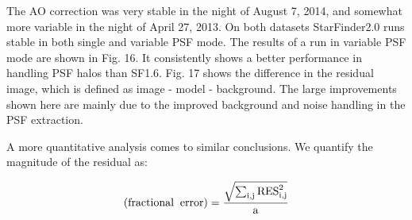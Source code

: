 The AO correction was very stable in the night of August 7, 2014, and somewhat more variable in the night of April 27, 2013. On both datasets StarFinder2.0 runs stable in both single and variable PSF mode. The results of a run in variable PSF mode are shown in Fig. 16. It consistently shows a better performance in handling PSF halos than SF1.6. Fig. 17 shows the difference in the residual image, which is defined as image - model - background. The large improvements shown here are mainly due to the improved background and noise handling in the PSF extraction.

A more quantitative analysis comes to similar conclusions. We quantify the magnitude of the residual as:

\begin{equation}
\rm(fractional \; \; error) = \frac{\sqrt{\sum_{i,j}\rm{RES}^2_{i,j}}}{a}
\end{equation}
  
  
  
  
  
  